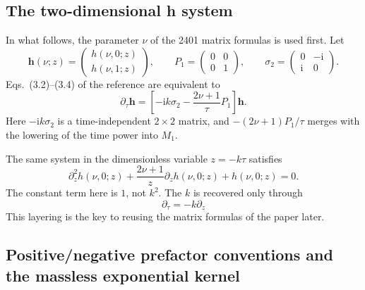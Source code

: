\documentclass[11pt,a4paper]{article}
\newcommand{\ii}{\mathrm i}
\begin{document}
\subsection{The two-dimensional h system}

In what follows, the parameter $\nu$ of the 2401 matrix formulas is used first. Let
\begin{equation}
 \bm h(\nu;z)=
 \begin{pmatrix}h(\nu,0;z)\\h(\nu,1;z)\end{pmatrix},
 \qquad
 P_1=\begin{pmatrix}0&0\\0&1\end{pmatrix},
 \qquad
 \sigma_2=\begin{pmatrix}0&-\ii\\ \ii&0\end{pmatrix}.
\end{equation}
Eqs.~(3.2)--(3.4) of the reference are equivalent to
\begin{equation}
 \partial_\tau\bm h
 =\left[-\ii k\sigma_2-\frac{2\nu+1}{\tau}P_1\right]\bm h.
 \label{eq:h-first-order-system}
\end{equation}
Here $-\ii k\sigma_2$ is a time-independent $2\times2$ matrix, and $-(2\nu+1)P_1/\tau$ merges with the lowering of the time power into $M_1$.

The same system in the dimensionless variable $z=-k\tau$ satisfies
\begin{equation}
 \partial_z^2h(\nu,0;z)
 +\frac{2\nu+1}{z}\partial_zh(\nu,0;z)
 +h(\nu,0;z)=0.
 \label{eq:h-dimensionless-eom}
\end{equation}
The constant term here is $1$, not $k^2$. The $k$ is recovered only through
\begin{equation}
 \partial_\tau=-k\partial_z
 \label{eq:tau-z-chain}
\end{equation}
This layering is the key to reusing the matrix formulas of the paper later.

\subsection{Positive/negative prefactor conventions and the massless exponential kernel}
\end{document}
